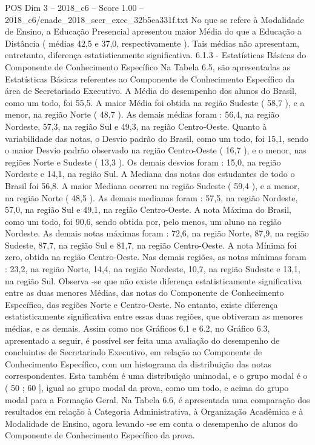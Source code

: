 \begin{textsample}{POS Dim 3 – 2018\_c6 – Score 1.00 – 2018\_c6/enade\_2018\_secr\_exec\_32b5ea331f.txt}
No que se refere à Modalidade de Ensino, a Educação Presencial apresentou maior Média do que a Educação a Distância ( médias 42,5 e 37,0, respectivamente ).
Tais médias não apresentam, entretanto, diferença estatisticamente significativa. 6.1.3 - Estatísticas Básicas do Componente de Conhecimento Específico Na Tabela 6.5, são apresentadas as Estatísticas Básicas referentes ao Componente de Conhecimento Específico da área de Secretariado Executivo.
A Média do desempenho dos alunos do Brasil, como um todo, foi 55,5.
A maior Média foi obtida na região Sudeste ( 58,7 ), e a menor, na região Norte ( 48,7 ).
As demais médias foram : 56,4, na região Nordeste, 57,3, na região Sul e 49,3, na região Centro-Oeste.
Quanto à variabilidade das notas, o Desvio padrão do Brasil, como um todo, foi 15,1, sendo o maior Desvio padrão observado na região Centro-Oeste ( 16,7 ), e o menor, nas regiões Norte e Sudeste ( 13,3 ).
Os demais desvios foram : 15,0, na região Nordeste e 14,1, na região Sul.
A Mediana das notas dos estudantes de todo o Brasil foi 56,8.
A maior Mediana ocorreu na região Sudeste ( 59,4 ), e a menor, na região Norte ( 48,5 ).
As demais medianas foram : 57,5, na região Nordeste, 57,0, na região Sul e 49,1, na região Centro-Oeste.
A nota Máxima do Brasil, como um todo, foi 90,6, sendo obtida por, pelo menos, um aluno na região Nordeste.
As demais notas máximas foram : 72,6, na região Norte, 87,9, na região Sudeste, 87,7, na região Sul e 81,7, na região Centro-Oeste.
A nota Mínima foi zero, obtida na região Centro-Oeste.
Nas demais regiões, as notas mínimas foram : 23,2, na região Norte, 14,4, na região Nordeste, 10,7, na região Sudeste e 13,1, na região Sul.
Observa -se que não existe diferença estatisticamente significativa entre as duas menores Médias, das notas do Componente de Conhecimento Específico, das regiões Norte e Centro-Oeste.
No entanto, existe diferença estatisticamente significativa entre essas duas regiões, que obtiveram as menores médias, e as demais.
Assim como nos Gráficos 6.1 e 6.2, no Gráfico 6.3, apresentado a seguir, é possível ser feita uma avaliação do desempenho de concluintes de Secretariado Executivo, em relação ao Componente de Conhecimento Específico, com um histograma da distribuição das notas correspondentes.
Esta também é uma distribuição unimodal, e o grupo modal é o ( 50 ; 60 ], igual ao grupo modal da prova, como um todo, e acima do grupo modal para a Formação Geral.
Na Tabela 6.6, é apresentada uma comparação dos resultados em relação à Categoria Administrativa, à Organização Acadêmica e à Modalidade de Ensino, agora levando -se em conta o desempenho de alunos do Componente de Conhecimento Específico da prova.

\end{textsample}
